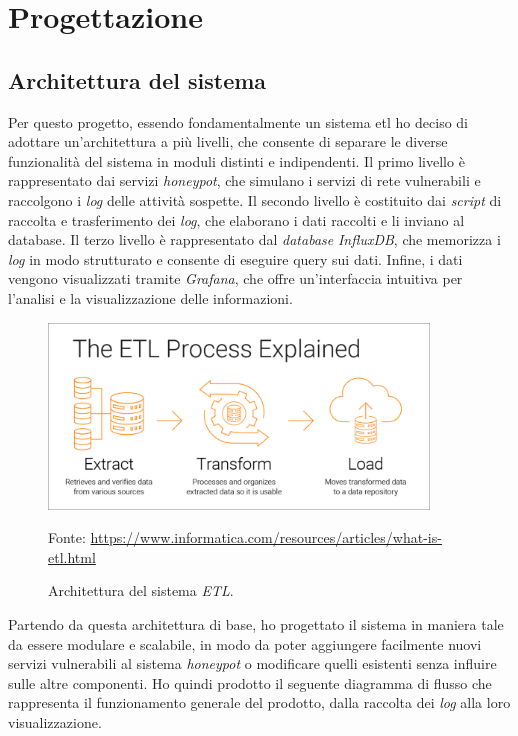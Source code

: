 \section{Progettazione}
\subsection{Architettura del sistema}
Per questo progetto, essendo fondamentalmente un sistema \gls{etl} ho deciso di adottare un'architettura a più livelli, che consente di separare le diverse funzionalità del sistema in moduli distinti e indipendenti.
Il primo livello è rappresentato dai servizi \textit{honeypot}, che simulano i servizi di rete vulnerabili e raccolgono i \textit{log} delle attività sospette.
Il secondo livello è costituito dai \textit{script} di raccolta e trasferimento dei \textit{log}, che elaborano i dati raccolti e li inviano al database.
Il terzo livello è rappresentato dal \textit{database} \textit{InfluxDB}, che memorizza i \textit{log} in modo strutturato e consente di eseguire query sui dati.
Infine, i dati vengono visualizzati tramite \textit{Grafana}, che offre un'interfaccia intuitiva per l'analisi e la visualizzazione delle informazioni.
\begin{figure}[H]
    \begin{center}
    \includegraphics[width=0.9\textwidth]{img/etl-process-explained-diagram.png}
    \caption{Architettura del sistema \textit{ETL}.}
    Fonte: \url{https://www.informatica.com/resources/articles/what-is-etl.html}
    \label{fig:etl-architecture}
    \end{center}
\end{figure}
Partendo da questa architettura di base, ho progettato il sistema in maniera tale da essere modulare e scalabile, in modo da poter aggiungere facilmente nuovi servizi vulnerabili al sistema \textit{honeypot} o modificare quelli esistenti senza influire sulle altre componenti.
Ho quindi prodotto il seguente diagramma di flusso che rappresenta il funzionamento generale del prodotto, dalla raccolta dei \textit{log} alla loro visualizzazione.
